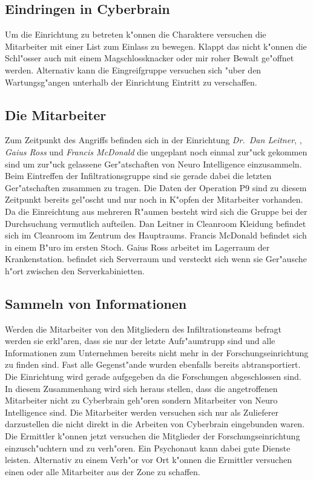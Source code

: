 \subsection{Eindringen in Cyberbrain} 
Um die Einrichtung zu betreten k"onnen die Charaktere versuchen die Mitarbeiter mit einer List zum Einlass zu bewegen. Klappt das nicht k"onnen die Schl"osser auch mit einem Magschlossknacker oder mir roher Bewalt ge"offnet werden. Alternativ kann die Eingreifgruppe versuchen sich "uber den Wartungsg"angen unterhalb der Einrichtung Eintritt zu verschaffen.

\subsection{Die Mitarbeiter} 
Zum Zeitpunkt des Angriffs befinden sich in der Einrichtung \emph{Dr.~Dan Leitner}, \emph{\ml{}}, \emph{Gaius Ross} und \emph{Francis McDonald} die ungeplant noch einmal zur"uck gekommen sind um zur"uck gelassene Ger"atschaften von Neuro Intelligence einzusammeln. Beim Eintreffen der Infiltrationsgruppe sind sie gerade dabei die letzten Ger"atschaften zusammen zu tragen. Die Daten der Operation P9 sind zu diesem Zeitpunkt bereits gel"oscht und nur noch in K"opfen der Mitarbeiter vorhanden. Da die Einreichtung aus mehreren R"aumen besteht wird sich die Gruppe bei der Durchsuchung vermutlich aufteilen. Dan Leitner in Cleanroom Kleidung befindet sich im Cleanroom im Zentrum des Hauptraums. Francis McDonald befindet sich in einem B"uro im ersten Stoch. Gaius Ross arbeitet im Lagerraum der Krankenstation. \ml{} befindet sich Serverraum und versteckt sich wenn sie Ger"ausche h"ort zwischen den Serverkabinietten.

\subsection{Sammeln von Informationen} 
Werden die Mitarbeiter von den Mitgliedern des Infiltrationsteams befragt werden sie erkl"aren, dass 
sie nur der letzte Aufr"aumtrupp sind und alle Informationen zum Unternehmen bereits nicht mehr in der Forschungseinrichtung zu finden sind. Fast alle Gegenst"ande wurden ebenfalls bereits abtransportiert. Die Einrichtung wird gerade aufgegeben da die Forschungen abgeschlossen sind. In diesem Zusammenhang wird sich heraus stellen, dass die angetroffenen Mitarbeiter nicht zu Cyberbrain geh"oren sondern Mitarbeiter von Neuro Intelligence sind. Die Mitarbeiter werden versuchen sich nur als Zulieferer darzustellen die nicht direkt in die Arbeiten von Cyberbrain eingebunden waren. Die Ermittler k"onnen jetzt versuchen die Mitglieder der Forschungseinrichtung einzusch"uchtern und zu verh"oren. Ein Psychonaut kann dabei gute Dienste leisten. Alternativ zu einem Verh"or vor Ort k"onnen die Ermittler versuchen einen oder alle Mitarbeiter aus der Zone zu schaffen. 

